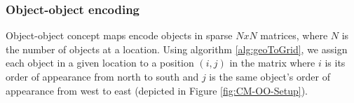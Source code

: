 \subsubsection{Object-object encoding}
Object-object concept maps encode objects in sparse $NxN$ matrices, where $N$ is the number of objects at a location. 
Using algorithm \ref{alg:geoToGrid}, we assign each object in a given location to a position $(i,j)$ in the matrix where $i$ is its order of appearance from north to south and $j$ is the same object's order of appearance from west to east (depicted in Figure \ref{fig:CM-OO-Setup}). 

